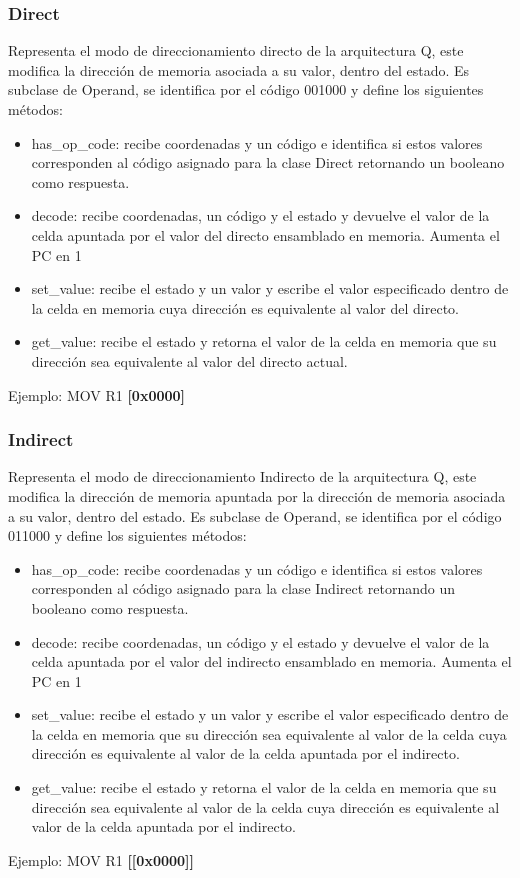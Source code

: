 \subsubsection{Direct}
Representa el modo de direccionamiento directo de la arquitectura Q, este modifica la dirección de memoria asociada a su valor, dentro del estado.
Es subclase de Operand, se identifica por el código 001000 y define los siguientes métodos:
 
\begin{itemize}
    \item has\_op\_code: recibe coordenadas y un código e identifica si estos valores corresponden al código asignado para la clase Direct retornando un booleano como respuesta.
    \item decode: recibe coordenadas, un código y el estado y devuelve el valor de la celda apuntada por el valor del directo ensamblado en memoria. Aumenta el PC en 1
    \item set\_value: recibe el estado y un valor y escribe el valor especificado dentro de la celda en memoria cuya dirección es equivalente al valor del directo.
    \item get\_value: recibe el estado y retorna el valor de la celda en memoria que su dirección sea equivalente al valor del directo actual.
\end{itemize}
Ejemplo: MOV R1 \textbf{[0x0000]}
 
\subsubsection{Indirect}
Representa el modo de direccionamiento Indirecto de la arquitectura Q, este modifica la dirección de memoria apuntada por la dirección de memoria asociada a su valor, dentro del estado.
Es subclase de Operand, se identifica por el código 011000 y define los siguientes métodos:
 
\begin{itemize}
    \item has\_op\_code: recibe coordenadas y un código e identifica si estos valores corresponden al código asignado para la clase Indirect retornando un booleano como respuesta.
    \item decode: recibe coordenadas, un código y el estado y devuelve el valor de la celda apuntada por el valor del indirecto ensamblado en memoria. Aumenta el PC en 1
    \item set\_value: recibe el estado y un valor y escribe el valor especificado dentro de la celda en memoria que su dirección sea equivalente al valor de la celda cuya dirección es equivalente al valor de la celda apuntada por el indirecto.
    \item get\_value: recibe el estado y retorna el valor de la celda en memoria que su dirección sea equivalente al valor de la celda cuya dirección es equivalente al valor de la celda apuntada por el indirecto.
\end{itemize}
Ejemplo: MOV R1 \textbf{[[0x0000]]}



